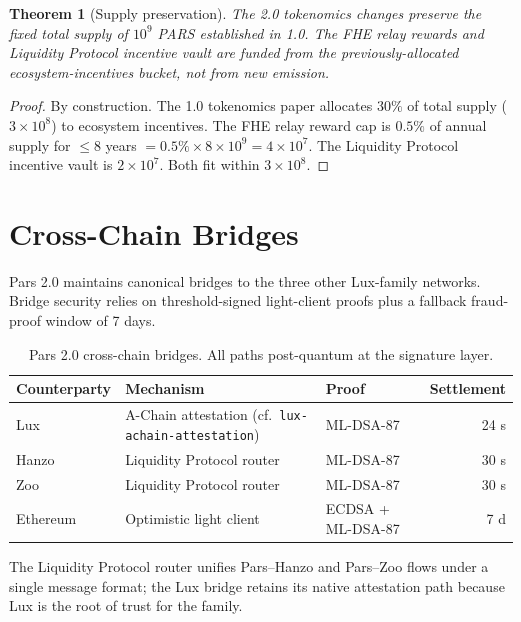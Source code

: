 \documentclass[11pt,a4paper]{article}
\newtheorem{theorem}{Theorem}[section]
\begin{document}
\begin{theorem}[Supply preservation]
The 2.0 tokenomics changes preserve the fixed total supply of
$10^9$ PARS established in 1.0. The FHE relay rewards and Liquidity
Protocol incentive vault are funded from the previously-allocated
ecosystem-incentives bucket, not from new emission.
\end{theorem}
\begin{proof}
By construction. The 1.0 tokenomics paper allocates $30\%$ of total
supply ($3 \times 10^8$) to ecosystem incentives. The FHE relay reward
cap is $0.5\%$ of annual supply for $\le 8$ years $= 0.5\% \times 8 \times
10^9 = 4 \times 10^7$. The Liquidity Protocol incentive vault is
$2 \times 10^7$. Both fit within $3 \times 10^8$.
\end{proof}

\section{Cross-Chain Bridges}
\label{sec:bridges}

Pars 2.0 maintains canonical bridges to the three other Lux-family
networks. Bridge security relies on threshold-signed light-client proofs
plus a fallback fraud-proof window of 7 days.

\begin{table}[H]
\centering
\small
\begin{tabular}{lllr}
\toprule
\textbf{Counterparty} & \textbf{Mechanism} & \textbf{Proof} & \textbf{Settlement} \\
\midrule
Lux & A-Chain attestation (cf.\ \texttt{lux-achain-attestation}) & ML-DSA-87 & 24 s \\
Hanzo & Liquidity Protocol router & ML-DSA-87 & 30 s \\
Zoo & Liquidity Protocol router & ML-DSA-87 & 30 s \\
Ethereum & Optimistic light client & ECDSA + ML-DSA-87 & 7 d \\
\bottomrule
\end{tabular}
\caption{Pars 2.0 cross-chain bridges. All paths post-quantum at the signature layer.}
\end{table}

The Liquidity Protocol router unifies Pars--Hanzo and Pars--Zoo flows
under a single message format; the Lux bridge retains its native
attestation path because Lux is the root of trust for the family.
\end{document}
